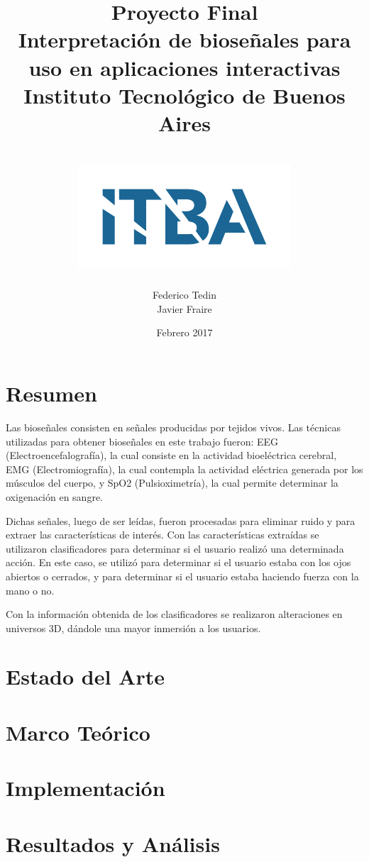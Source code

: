 \documentclass[a4paper]{report}
\title{
	{\Huge Proyecto Final}\\
	{\Huge Interpretación de bioseñales para uso en aplicaciones interactivas}
	{\large Instituto Tecnológico de Buenos Aires}\\~\\
	{\includegraphics{itba.png}}
}
\author{{Federico Tedin} \\ {Javier Fraire}}
\date{Febrero 2017}
\begin{document}
\maketitle

\chapter*{Resumen}
\justifying
Las bioseñales consisten en señales producidas por tejidos vivos. Las técnicas utilizadas para obtener bioseñales en este trabajo fueron: EEG (Electroencefalografía), la cual consiste en la actividad bioeléctrica cerebral, EMG (Electromiografía), la cual contempla la actividad eléctrica generada por los músculos del cuerpo, y SpO2 (Pulsioximetría), la cual permite determinar la oxigenación en sangre.

Dichas señales, luego de ser leídas, fueron procesadas para eliminar ruido y para extraer las características de interés. Con las características extraídas se utilizaron clasificadores para determinar si el usuario realizó una determinada acción. En este caso, se utilizó para determinar si el usuario estaba con los ojos abiertos o cerrados, y para determinar si el usuario estaba haciendo fuerza con la mano o no.

Con la información obtenida de los clasificadores se realizaron alteraciones en universos 3D, dándole una mayor inmersión a los usuarios.

\tableofcontents

\chapter{Estado del Arte}


\chapter{Marco Teórico}


\chapter{Implementación}


\chapter{Resultados y Análisis}


{}

 
\end{document}

